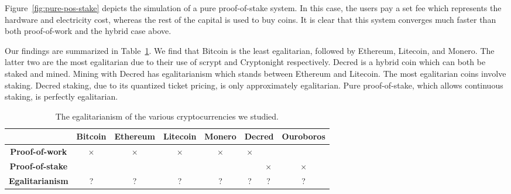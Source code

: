 Figure~\ref{fig:pure-pos-stake} depicts the simulation of a pure proof-of-stake system. In this case, the users pay a set fee which represents the hardware and electricity cost, whereas the rest of the capital is used to buy coins. It is clear that this system converges much faster than both proof-of-work and the hybrid case above.



Our findings are summarized in Table~\ref{tbl:egalitarianism}. We find that
Bitcoin is the least egalitarian, followed by Ethereum, Litecoin, and Monero.
The latter two are the most egalitarian due to their use of scrypt and
Cryptonight respectively. Decred is a hybrid coin which can both be staked and
mined. Mining with Decred has egalitarianism which stands between Ethereum and
Litecoin. The most egalitarian coins involve staking. Decred staking, due to its
quantized ticket pricing, is only approximately egalitarian. Pure proof-of-stake, which
allows continuous staking, is perfectly egalitarian.


\begin{table}
  \centering
  \begin{tabular}{|c|c|c|c|c|c|c|c|}
    \hline
    & Bitcoin & Ethereum & Litecoin & Monero & \multicolumn{2}{c|}{Decred} & Ouroboros\\
    \hline
    \textbf{Proof-of-work} &
    $\times$ & $\times$ & $\times$ & $\times$ & $\times$ & & \\
    \hline
    \textbf{Proof-of-stake} &
    & & & & & $\times$ & $\times$ \\
    \hline
    \textbf{Egalitarianism} &
    ? & ? & ? & ? & ? & ? & ? \\
    \hline
  \end{tabular}
  \caption{The egalitarianism of the various cryptocurrencies we studied.}
  \label{tbl:egalitarianism}
\end{table}

